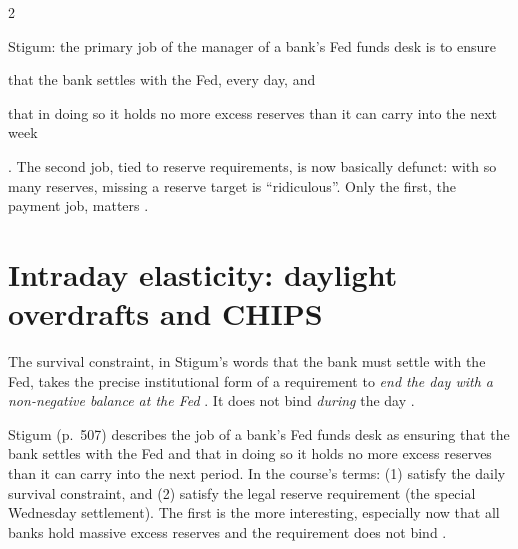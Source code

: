 \begin{paracol}{2}
\begin{finance}
Stigum: the primary job of the manager of a bank's Fed funds desk is to ensure
\begin{enumerate*}[(i)]
  \item that the bank settles with the Fed, every day, and
  \item that in doing so it holds no more excess reserves than it can carry into the next week
\end{enumerate*} . The second job, tied to reserve requirements, is now basically defunct: with so many reserves, missing a reserve target is
``ridiculous''. Only the first, the payment job, matters .
\end{finance}

\section{Intraday elasticity: daylight overdrafts and CHIPS}\label{sec:ff-intraday}

The survival constraint, in Stigum's words that the bank must settle with the Fed, takes the precise institutional form of a requirement to \emph{end
the day with a non-negative balance at the Fed} . It does not bind \emph{during} the day .

\begin{reading}
Stigum (p.~507) describes the job of a bank's Fed funds desk as ensuring that the bank settles with the Fed and that in doing so it holds no more excess
reserves than it can carry into the next period. In the course's terms: (1) satisfy the daily survival constraint, and (2) satisfy the legal reserve
requirement (the special Wednesday settlement). The first is the more interesting, especially now that all banks hold massive excess reserves and the
requirement does not bind .
\end{reading}


\end{paracol}
